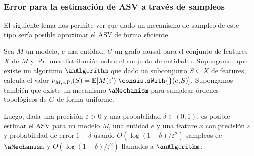\subsubsection{Error para la estimación de ASV a través de sampleos} \label{subsubSection:proofErrorSamplingASV}

El siguiente lema nos permite ver que dado un mecanismo de sampleo de este tipo sería posible aproximar el ASV de forma eficiente.

\begin{lemma}
    \label{theorem:asvSamplingError}

    Sea $M$ un modelo, $e$ una entidad, $G$ un grafo causal para el conjunto de features $X$ de $M$ y $\Pr$ una distribución sobre el conjunto de entidades. Supongamos que existe un algoritmo $\anAlgorithm$ que dado un subconjunto $S \subseteq X$ de features, calcula el valor $\nu_{M, e, \Pr}(S) =\mathbb{E}[M(e') | \consistsWith{}(e, S)]$. Supongamos también que existe un mecanismo $\aMechanism$ para samplear órdenes topológicos de $G$ de forma uniforme.

    Luego, dada una precisión $\varepsilon > 0$ y una probabilidad $\delta \in (0, 1)$, es posible estimar el ASV para un modelo $M$, una entidad $e$ y una feature $x$ con precisión $\varepsilon$ y probabilidad de error $1-\delta$ usando $O(\log(1-\delta)/\varepsilon^2)$ sampleos de $\aMechanism$ y $O(\log(1-\delta) / \varepsilon^2)$ llamados a $\anAlgorithm$.
    
\end{lemma}

